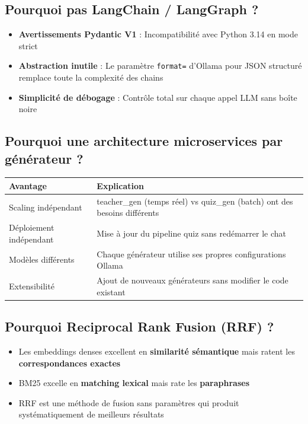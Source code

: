 \documentclass[12pt,a4paper]{article}
\begin{document}
\subsection{Pourquoi pas LangChain / LangGraph ?}

\begin{itemize}
    \item \textbf{Avertissements Pydantic V1} : Incompatibilité avec Python 3.14 en mode strict
    \item \textbf{Abstraction inutile} : Le paramètre \texttt{format=} d'Ollama pour JSON structuré remplace toute la complexité des chains
    \item \textbf{Simplicité de débogage} : Contrôle total sur chaque appel LLM sans boîte noire
\end{itemize}

\subsection{Pourquoi une architecture microservices par générateur ?}

\begin{table}[H]
    \centering
    \begin{tabularx}{\textwidth}{@{}lX@{}}
        \toprule
        \textbf{Avantage} & \textbf{Explication} \\
        \midrule
        Scaling indépendant & teacher\_gen (temps réel) vs quiz\_gen (batch) ont des besoins différents \\
        Déploiement indépendant & Mise à jour du pipeline quiz sans redémarrer le chat \\
        Modèles différents & Chaque générateur utilise ses propres configurations Ollama \\
        Extensibilité & Ajout de nouveaux générateurs sans modifier le code existant \\
        \bottomrule
    \end{tabularx}
\end{table}

\subsection{Pourquoi Reciprocal Rank Fusion (RRF) ?}

\begin{itemize}
    \item Les embeddings denses excellent en \textbf{similarité sémantique} mais ratent les \textbf{correspondances exactes}
    \item BM25 excelle en \textbf{matching lexical} mais rate les \textbf{paraphrases}
    \item RRF est une méthode de fusion sans paramètres qui produit systématiquement de meilleurs résultats
\end{itemize}
\end{document}

